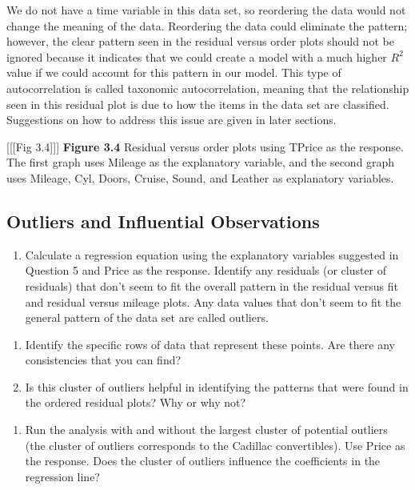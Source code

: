 \documentclass[
]{report}
\providecommand{\tightlist}{%
  \setlength{\itemsep}{0pt}\setlength{\parskip}{0pt}}
\begin{document}
We do not have a time variable in this data set, so reordering the data would not change the meaning of the data. Reordering the data could eliminate the pattern; however, the clear pattern seen in the residual versus order plots should not be ignored because it indicates that we could create a model with a much higher \(R^2\) value if we could account for this pattern in our model. This type of autocorrelation is called taxonomic autocorrelation, meaning that the relationship seen in this residual plot is due to
how the items in the data set are classified. Suggestions on how to address this issue are given in later sections.

{[}{[}{[}Fig 3.4{]}{]}{]}
\textbf{Figure 3.4} Residual versus order plots using TPrice as the response. The first graph uses Mileage as the explanatory variable, and the second graph uses Mileage, Cyl, Doors, Cruise, Sound, and Leather as explanatory variables.

\subsection*{Outliers and Influential Observations}\label{outliers-and-influential-observations}

\begin{enumerate}
\def\labelenumi{\arabic{enumi}.}
\setcounter{enumi}{10}
\tightlist
\item
  Calculate a regression equation using the explanatory variables suggested in Question 5 and Price as the response. Identify any residuals (or cluster of residuals) that don't seem to fit the overall pattern in the residual versus fit and residual versus mileage plots. Any data values that don't seem to fit the general pattern of the data set are called outliers.
\end{enumerate}

\begin{enumerate}
\def\labelenumi{\alph{enumi}.}
\item
  Identify the specific rows of data that represent these points. Are there any consistencies that you can find?
\item
  Is this cluster of outliers helpful in identifying the patterns that were found in the ordered residual plots? Why or why not?
\end{enumerate}

\begin{enumerate}
\def\labelenumi{\arabic{enumi}.}
\setcounter{enumi}{11}
\tightlist
\item
  Run the analysis with and without the largest cluster of potential outliers (the cluster of outliers corresponds to the Cadillac convertibles). Use Price as the response. Does the cluster of outliers influence the coefficients in the regression line?
\end{enumerate}
\end{document}

